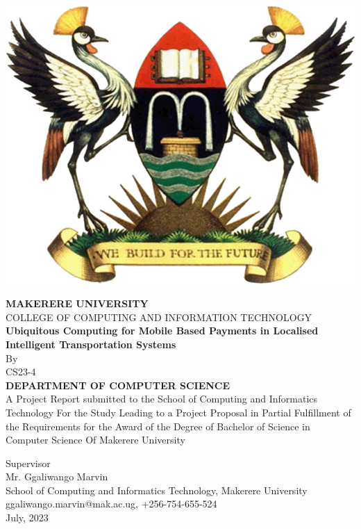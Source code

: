 \documentclass[14pt]{report}
\begin{document}
    \begin{titlepage}
        \begin{center}
            \includegraphics[scale=0.25]{images/muk}

            \textbf{MAKERERE UNIVERSITY}
            \\COLLEGE OF COMPUTING AND INFORMATION TECHNOLOGY
            \vspace{1cm}
            \\{\textbf{ Ubiquitous Computing for Mobile Based Payments in Localised Intelligent Transportation Systems}}
            \vspace{0.5cm}
            \\By
            \\CS23-4
            \vspace{0.5cm}
            \\{\textbf{
                DEPARTMENT OF COMPUTER SCIENCE
            }}
            \vspace{0.5cm}
            \\A Project Report submitted to the School of Computing and Informatics Technology
            For the Study Leading to a Project Proposal in Partial Fulfillment of the
            Requirements for the Award of the Degree of Bachelor of Science in Computer Science
            Of Makerere University
            \vspace{0.5cm}

            Supervisor
            \vspace{0.2cm}
            \\Mr. Ggaliwango Marvin
            \vspace{0.2cm}
            \\School of Computing and Informatics Technology, Makerere University
            \\ggaliwango.marvin@mak.ac.ug, +256-754-655-524
            \\July, 2023
        \end{center}
    \end{titlepage}
\end{document}
